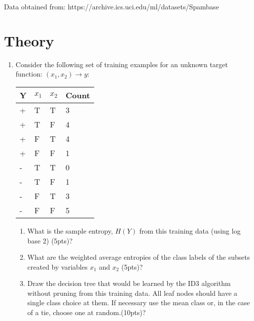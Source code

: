 \documentclass[12pt]{article}
\begin{document}
\noindent
Data obtained from:  https://archive.ics.uci.edu/ml/datasets/Spambase


\newpage
\section{Theory}
\begin{enumerate}
\item Consider the following set of training examples for an unknown target function:  $(x_1, x_2)\rightarrow y$:
\begin{table}[h]
\begin{center}
\begin{tabular}{|l|l|l|l|}
\hline
Y & $x_1$ & $x_2$ & Count\\
\hline
+ & T & T & 3\\
+ & T & F & 4\\
+ & F & T & 4\\
+ & F & F & 1\\
- & T & T & 0\\
- & T & F & 1\\
- & F & T & 3\\
- & F & F & 5\\
\hline
\end{tabular}
\end{center}
\end{table}
	\begin{enumerate}
	\item What is the sample entropy, $H(Y)$ from this training data (using log base 2) (5pts)?
	\item What are the weighted average entropies of the class labels of the subsets created by variables $x_1$ and $x_2$ (5pts)?
	\item Draw the decision tree that would be learned by the ID3 algorithm without pruning from this training data.  All leaf nodes should have a single class choice at them.  If necessary use the mean class or, in the case of a tie, choose one at random.(10pts)?
	\end{enumerate}
	

\end{enumerate}
\end{document}
